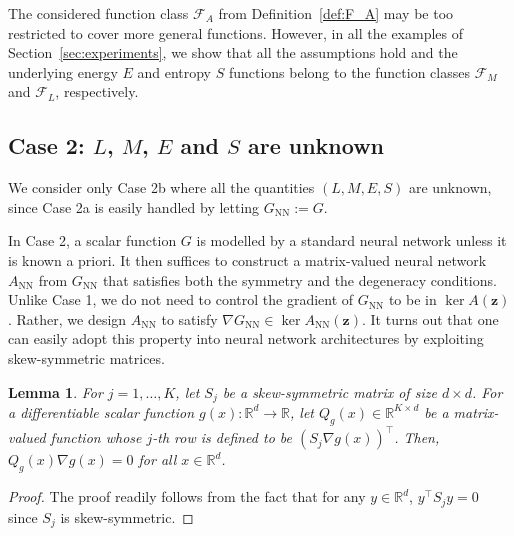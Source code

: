 \documentclass[openacc]{rsproca_new}%
\newcommand{\z}{\bm{z}}
\newtheorem{lemma}{Lemma}
\begin{document}
The considered function class 
$\mathcal{F}_A$ from Definition~\ref{def:F_A}
may be too restricted to cover 
more general functions.
However, in all the examples of
Section~\ref{sec:experiments},
we show that all the assumptions hold and the underlying energy $E$ and entropy $S$ functions belong to
the function classes 
$\mathcal{F}_M$ and $\mathcal{F}_L$,
respectively.



\subsection{Case 2: \texorpdfstring{$L$}{L}, \texorpdfstring{$M$}{M}, \texorpdfstring{$E$}{E} and \texorpdfstring{$S$}{S} are unknown}
We consider only Case 2b 
where all the quantities $(L,M,E,S)$ are unknown,
since Case 2a is easily handled 
by letting $G_{\text{NN}} := G$.


In Case 2, 
a scalar function $G$ is modelled by a standard neural network unless it is known a priori. 
It then suffices to construct a matrix-valued neural network $A_{\text{NN}}$ from $G_{\text{NN}}$ that satisfies both the symmetry
and the degeneracy conditions.
Unlike Case 1, we do not need to control the gradient of $G_{\text{NN}}$ to be in $\ker A(\z)$.
Rather, we design $A_{\text{NN}}$ 
to satisfy $\nabla G_{\text{NN}} \in \ker A_{\text{NN}}(\z)$.
It turns out that 
one can easily adopt this property into 
neural network architectures
by exploiting skew-symmetric matrices. 

\begin{lemma} \label{lemma-Q}
    For $j=1,\dots,K$, let $S_j$ be a skew-symmetric matrix of size $d\times d$.
    For a differentiable scalar function $g(x):\mathbb{R}^d \to \mathbb{R}$,
    let $Q_g(x) \in \mathbb{R}^{K\times d}$ be a matrix-valued function whose $j$-th row is 
    defined to be 
    $(S_j\nabla g(x))^\top$.
    Then, $Q_g(x) \nabla g(x)= 0$ for all $x \in \mathbb{R}^d$.
\end{lemma}
\begin{proof}
    The proof readily follows from the fact that for any $y \in \mathbb{R}^d$, $y^\top S_j y = 0$
    since $S_j$ is skew-symmetric.
\end{proof}
\end{document}
